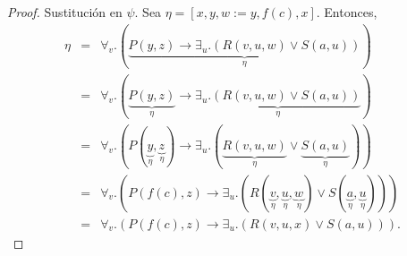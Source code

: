 \documentclass{article}
\begin{document}
\begin{enumerate}
\begin{proof}
    Sustitución en $\psi$. Sea $\eta = [x,y,w := y, f(c), x]$. Entonces,
    \begin{eqnarray*}
      [\forall_{v}.(P(y,z) \rightarrow \exists_{u}.(R(v, u, w) \lor S(a,u)))] \eta &=&
       \forall_{v}.(\underbrace{P(y,z) \rightarrow \exists_{u}.(R(v, u, w) \lor S(a,u))}_{\eta})\\
       &=& \forall_{v}.(\underbrace{P(y,z)}_{\eta} \rightarrow \underbrace{\exists_{u}.(R(v, u, w) \lor S(a,u))}_{\eta})\\
       &=& \forall_{v}.(P(\underbrace{y}_{\eta}, \underbrace{z}_{\eta}) \rightarrow \exists_{u}.(\underbrace{R(v, u, w)}_{\eta} \lor \underbrace{S(a,u)}_{\eta}))\\
       &=& \forall_{v}.(P(f(c), z) \rightarrow \exists_{u}.(R(\underbrace{v}_{\eta}, \underbrace{u}_{\eta}, \underbrace{w}_{\eta}) \lor S(\underbrace{a}_{\eta},\underbrace{u}_{\eta})))\\
       &=& \forall_{v}.(P(f(c), z) \rightarrow \exists_{u}.(R(v, u, x) \lor S(a,u))).
    \end{eqnarray*}
  \end{proof}
\end{enumerate}
\end{document}
